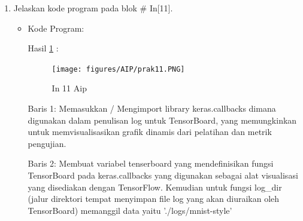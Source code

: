\begin{enumerate}
\item Jelaskan kode program pada blok \# In[11].
\begin{itemize}
\item Kode Program:

\par Hasil \ref{in11aip} :
\begin{figure}[!hbtp]
\centering
\texttt{[image: figures/AIP/prak11.PNG]}
\caption{In 11 Aip}
\label{in11aip}
\end{figure}
\par Baris 1: Memasukkan / Mengimport library keras.callbacks dimana digunakan dalam penulisan log untuk TensorBoard, yang memungkinkan untuk memvisualisasikan grafik dinamis dari pelatihan dan metrik pengujian.
\par Baris 2: Membuat variabel tenserboard yang mendefinisikan fungsi TensorBoard pada keras.callbacks yang digunakan sebagai alat visualisasi yang disediakan dengan TensorFlow. Kemudian untuk fungsi log\_dir (jalur direktori tempat menyimpan file log yang akan diuraikan oleh TensorBoard) memanggil data yaitu './logs/mnist-style'
\end{itemize}
\par


\end{enumerate}
